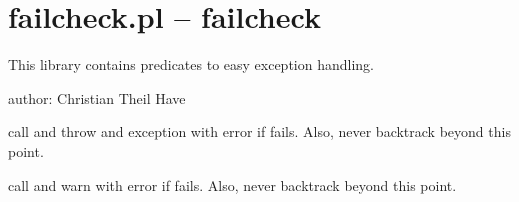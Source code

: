 


\section{failcheck.pl -- failcheck}

\label{sec:failcheck}

This library contains predicates to easy exception handling.

author: Christian Theil Have\vspace{0.7cm}

\begin{description}
call  and throw and exception with error if  fails.
Also, never backtrack beyond this point.

call  and warn with error if  fails.
Also, never backtrack beyond this point.
\end{description}

